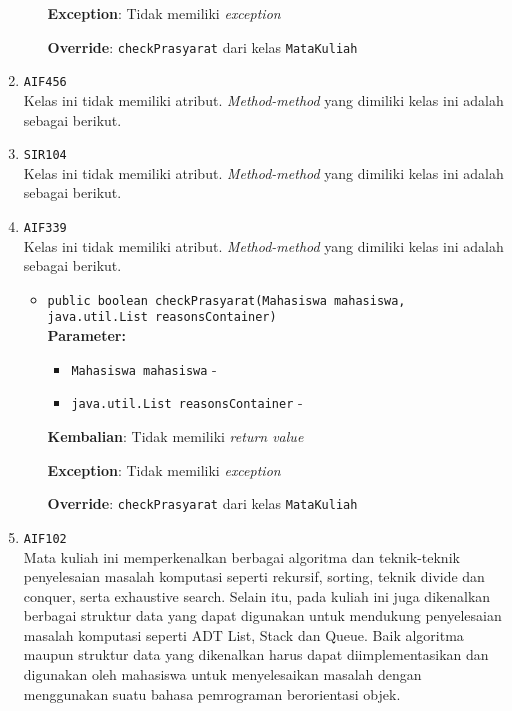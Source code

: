 \documentclass{article}
\begin{document}
\begin{enumerate}
\begin{itemize}
\textbf{Exception}: Tidak memiliki \textit{exception}

\textbf{Override}: \texttt{checkPrasyarat} dari kelas \texttt{MataKuliah}

\end{itemize}
\item \texttt{AIF456}\\ 
Kelas ini tidak memiliki atribut. \textit{Method-method} yang dimiliki kelas ini adalah sebagai berikut.
\begin{itemize}
\end{itemize}
\item \texttt{SIR104}\\ 
Kelas ini tidak memiliki atribut. \textit{Method-method} yang dimiliki kelas ini adalah sebagai berikut.
\begin{itemize}
\end{itemize}
\item \texttt{AIF339}\\ 
Kelas ini tidak memiliki atribut. \textit{Method-method} yang dimiliki kelas ini adalah sebagai berikut.
\begin{itemize}
\item \texttt{public boolean checkPrasyarat(Mahasiswa mahasiswa, java.util.List reasonsContainer)}\\ 


\textbf{Parameter:}\begin{itemize}
\item \texttt{Mahasiswa mahasiswa} - 
\item \texttt{java.util.List reasonsContainer} - 
\end{itemize}
\textbf{Kembalian}: Tidak memiliki \textit{return value}

\textbf{Exception}: Tidak memiliki \textit{exception}

\textbf{Override}: \texttt{checkPrasyarat} dari kelas \texttt{MataKuliah}

\end{itemize}
\item \texttt{AIF102}\\ 
Mata kuliah ini memperkenalkan berbagai algoritma dan teknik-teknik 
 penyelesaian masalah komputasi seperti rekursif, sorting, teknik divide dan 
 conquer, serta exhaustive search. Selain itu, pada kuliah ini juga 
 dikenalkan berbagai struktur data yang dapat digunakan untuk mendukung 
 penyelesaian masalah komputasi seperti ADT List, Stack dan Queue. Baik 
 algoritma maupun struktur data yang dikenalkan harus dapat diimplementasikan 
 dan digunakan oleh mahasiswa untuk menyelesaikan masalah dengan menggunakan 
 suatu bahasa pemrograman berorientasi objek.


\end{enumerate}
\end{document}
